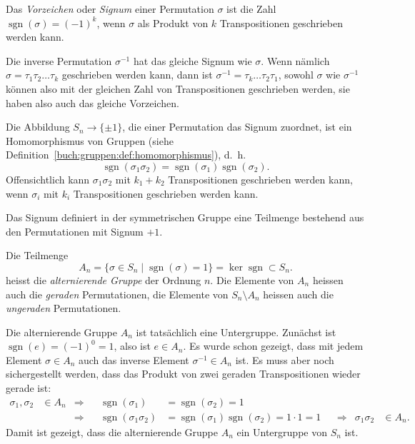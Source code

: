 \begin{definition}
%
%
Das {\em Vorzeichen} oder {\em Signum} einer Permutation $\sigma$ ist
die Zahl $\operatorname{sgn}(\sigma)=(-1)^k$, wenn $\sigma$ als Produkt
von $k$ Transpositionen geschrieben werden kann.
\end{definition}

Die inverse Permutation $\sigma^{-1}$ hat das gleiche Signum wie $\sigma$.
Wenn nämlich $\sigma= \tau_1\tau_2\dots\tau_k$ geschrieben werden kann,
dann ist $\sigma^{-1}=\tau_k\dots\tau_2\tau_1$, sowohl $\sigma$ wie
$\sigma^{-1}$ können also mit der gleichen Zahl von Transpositionen
geschrieben werden, sie haben also auch das gleiche Vorzeichen.

Die Abbildung $S_n\to\{\pm1\}$, die einer Permutation das Signum zuordnet,
ist ein Homomorphismus von Gruppen
(siehe Definition~\ref{buch:gruppen:def:homomorphismus}),
%
d.~h.
\[
\operatorname{sgn}(\sigma_1\sigma_2)
=
\operatorname{sgn}(\sigma_1)
\operatorname{sgn}(\sigma_2).
\]
Offensichtlich kann $\sigma_1\sigma_2$ mit $k_1+k_2$ Transpositionen
geschrieben werden kann, wenn $\sigma_i$ mit $k_i$ Transpositionen geschrieben
werden kann.

Das Signum definiert in der symmetrischen Gruppe eine Teilmenge bestehend
aus den Permutationen mit Signum $+1$.

\begin{definition}
Die Teilmenge
\[
A_n
=
\{
\sigma\in S_n\;|\; \operatorname{sgn}(\sigma)=1
\}
=
\ker \operatorname{sgn}
\subset
S_n.
\]
%
%
heisst die {\em alternierende Gruppe} der Ordnung $n$.
Die Elemente von $A_n$ heissen auch die {\em geraden} Permutationen,
%
%
die
Elemente von $S_n\setminus A_n$ heissen auch die {\em ungeraden}
Permutationen.
\end{definition}

Die alternierende Gruppe $A_n$ ist tatsächlich eine Untergruppe.
%
Zunächst ist $\operatorname{sgn}(e)=(-1)^0=1$, also ist $e\in A_n$.
Es wurde schon gezeigt, dass mit jedem Element $\sigma\in A_n$ auch
das inverse Element $\sigma^{-1}\in A_n$ ist.
Es muss aber noch sichergestellt werden, dass das Produkt von zwei
geraden Transpositionen wieder gerade ist:
\[
\begin{aligned}
\sigma_1,\sigma_2&\in A_n
&\Rightarrow&&
\operatorname{sgn}(\sigma_1)
&=
\operatorname{sgn}(\sigma_2)
=
1
\\
&&\Rightarrow&&
\operatorname{sgn}(\sigma_1\sigma_2)
&=
\operatorname{sgn}(\sigma_1)
\operatorname{sgn}(\sigma_2)
=
1\cdot 1=1
&&\Rightarrow&
\sigma_1\sigma_2&\in A_n.
\end{aligned}
\]
Damit ist gezeigt, dass die alternierende Gruppe $A_n$ ein Untergruppe von 
$S_n$ ist.

